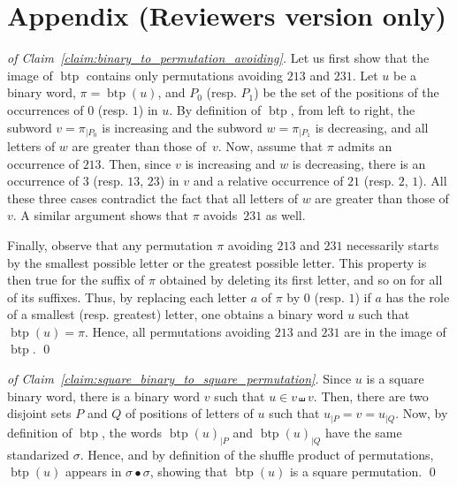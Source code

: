 \documentclass[a4paper]{llncs}
\DeclareMathOperator{\SHUFFLE}{\bullet}
\DeclareMathOperator{\BINTOPERM}{\mathrm{btp}}
\begin{document}





\newpage
\section*{Appendix (Reviewers version only)}

\begin{proof}[of Claim~\ref{claim:binary_to_permutation_avoiding}]
    Let us first show that the image of $\BINTOPERM$ contains only
    permutations avoiding $213$ and $231$. Let $u$ be a binary word,
    $\pi = \BINTOPERM(u)$, and $P_0$ (resp. $P_1$) be the set of the
    positions of the occurrences of $0$ (resp. $1$) in $u$. By
    definition of $\BINTOPERM$, from left to right, the subword
    $v = \pi_{|P_0}$ is increasing and the subword $w = \pi_{|P_1}$
    is decreasing, and all letters of $w$ are greater than those
    of~$v$. Now, assume that $\pi$ admits an occurrence of $213$.
    Then, since $v$ is increasing and $w$ is decreasing, there is an
    occurrence of $3$ (resp. $13$, $23$) in $v$ and a relative
    occurrence of $21$ (resp. $2$, $1$). All these three cases
    contradict the fact that all letters of $w$ are greater than
    those of $v$. A similar argument shows that $\pi$ avoids~$231$
    as well.
    \smallskip

    Finally, observe that any permutation $\pi$ avoiding $213$ and
    $231$ necessarily starts by the smallest possible letter or the
    greatest possible letter. This property is then true for the
    suffix of $\pi$ obtained by deleting its first letter,
    and so on for all of its suffixes. Thus, by
    replacing each letter $a$ of $\pi$ by $0$ (resp. $1$) if $a$ has the
    role of a smallest (resp. greatest) letter, one obtains a binary
    word $u$ such that $\BINTOPERM(u) = \pi$. Hence, all permutations
    avoiding $213$ and $231$ are in the image of $\BINTOPERM$.
    \qed
\end{proof}
\bigskip

\begin{proof}[of Claim~\ref{claim:square_binary_to_square_permutation}]
    Since $u$ is a square binary word, there is a binary word $v$
    such that $u \in v \shuffle v$. Then, there are two disjoint
    sets $P$ and $Q$ of positions of letters of $u$ such that
    $u_{|P} = v = u_{|Q}$. Now, by definition of $\BINTOPERM$, the
    words $\BINTOPERM(u)_{|P}$ and $\BINTOPERM(u)_{|Q}$ have the
    same standarized $\sigma$. Hence, and by definition of
    the shuffle product of permutations, $\BINTOPERM(u)$ appears in
    $\sigma \SHUFFLE \sigma$, showing that $\BINTOPERM(u)$ is a
    square permutation.
    \qed
\end{proof}
\bigskip
\end{document}
